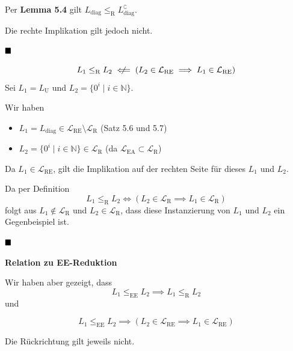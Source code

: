 \documentclass[a4paper, 11pt]{article}
\def\N{\mathbb{N}}
\def\L{\mathcal{L}}
\def\Lre{\mathcal{L}_\text{RE}}
\def\Lr{\mathcal{L}_\text{R}}
\newcommand\myTitle[1]{{\large \textbf {#1}}}
\begin{document}
                            Per \textbf{Lemma 5.4} gilt $L_{\text{diag}} \leq_{\text{R}} L_{\text{diag}}^\complement$.
                        
                            Die rechte Implikation gilt jedoch nicht.
                            
                            $\hfill\blacksquare$
                        
                            $$L_1 \leq_{\text{R}} L_2 \centernot{\impliedby} (L_2 \in \Lre \implies L_1 \in \Lre)$$
                            Sei $L_1 = L_{\text{U}}$ und $L_2 = \{0^i \mid i \in \N\}$.
                        
                            Wir haben 
                            \begin{itemize}[label=$\blacktriangleright$]
                                \item $L_1 = L_{\text{diag}} \in \Lre \setminus \Lr$ \hfill (Satz 5.6 und 5.7)
                                \item $L_2 = \{0^i \mid i \in \N\} \in \Lr$ \hfill(da $\L_{\text{EA}} \subset \Lr$)
                            \end{itemize}
                            
                            Da $L_1 \in \Lre$, gilt die Implikation auf der rechten Seite für dieses $L_1$ und $L_2$.
                        
                            
                            Da per Definition
                            $$L_1 \leq_{\text{R}} L_2 \iff (L_2 \in \Lr \implies L_1 \in \Lr)$$
                            folgt aus $L_1 \notin \Lr$ und $L_2 \in \Lr$, dass diese Instanzierung von $L_1$ und $L_2$ ein Gegenbeispiel ist.
                            
                            $\hfill\blacksquare$
                        
                            \myTitle{Relation zu EE-Reduktion}

                            Wir haben aber gezeigt, dass 
                            $$L_1 \leq_{\text{EE}} L_2 \implies L_1 \leq_{\text{R}} L_2$$
                            und 
                            
                            $$L_1 \leq_{\text{EE}} L_2 \implies (L_2 \in \Lre \implies L_1 \in \Lre)$$
                        
                            Die Rückrichtung gilt jeweils nicht.
                
\end{document}
